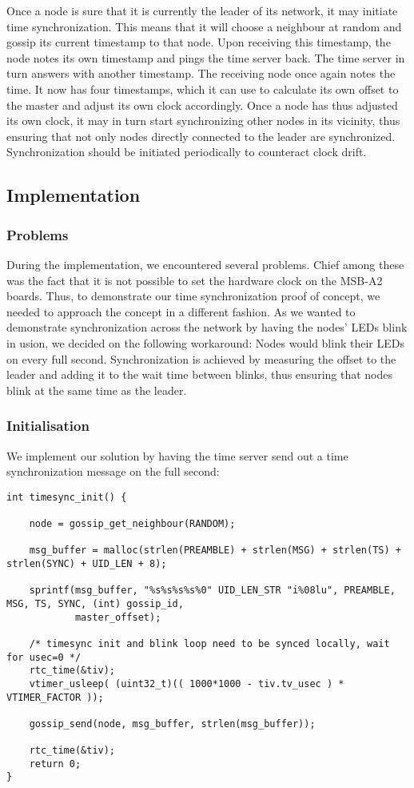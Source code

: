 \documentclass[11pt,
  a4paper,
  ngerman,
  BCOR=7mm
]{scrartcl}
\begin{document}
Once a node is sure that it is currently the leader of its network, it
may initiate time synchronization. This means that it will choose
a neighbour at random and gossip its current timestamp to that node.
Upon receiving this timestamp, the node notes its own timestamp and
pings the time server back. The time server in turn answers with another
timestamp. The receiving node once again notes the time. It now has four
timestamps, which it can use to calculate its own offset to the master
and adjust its own clock accordingly. Once a node has thus adjusted its
own clock, it may in turn start synchronizing other nodes in its
vicinity, thus ensuring that not only nodes directly connected to the
leader are synchronized. Synchronization should be initiated
periodically to counteract clock drift.

\subsection*{Implementation}
\label{sub:implementation_time_synchronization}

\subsubsection*{Problems}
\label{ssub:timesync_problems}
During the implementation, we encountered several problems. Chief among
these was the fact that it is not possible to set the hardware clock on
the MSB-A2 boards. Thus, to demonstrate our time synchronization proof
of concept, we needed to approach the concept in a different fashion. As
we wanted to demonstrate synchronization across the network by having
the nodes' LEDs blink in usion, we decided on the following workaround:
Nodes would blink their LEDs on every full second. Synchronization is
achieved by measuring the offset to the leader and adding it to the wait
time between blinks, thus ensuring that nodes blink at the same time as
the leader.

\subsubsection*{Initialisation}
\label{ssub:timesync_initialisation}
We implement our solution by having the time server send out a time
synchronization message on the full second:

\begin{lstlisting}
int timesync_init() {

    node = gossip_get_neighbour(RANDOM);

    msg_buffer = malloc(strlen(PREAMBLE) + strlen(MSG) + strlen(TS) + strlen(SYNC) + UID_LEN + 8);

    sprintf(msg_buffer, "%s%s%s%s%0" UID_LEN_STR "i%08lu", PREAMBLE, MSG, TS, SYNC, (int) gossip_id,
            master_offset);

    /* timesync init and blink loop need to be synced locally, wait for usec=0 */
    rtc_time(&tiv);
    vtimer_usleep( (uint32_t)(( 1000*1000 - tiv.tv_usec ) * VTIMER_FACTOR ));

    gossip_send(node, msg_buffer, strlen(msg_buffer));

    rtc_time(&tiv);
    return 0;
}
\end{lstlisting}
\end{document}
